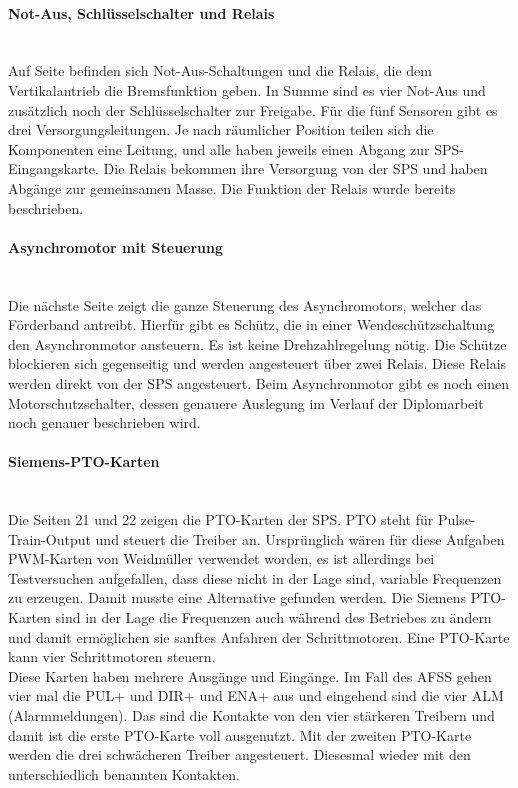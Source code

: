     \paragraph{Not-Aus, Schlüsselschalter und Relais}\mbox{}\\
    Auf Seite befinden sich Not-Aus-Schaltungen und die Relais, die dem Vertikalantrieb die Bremsfunktion geben. In Summe sind es vier Not-Aus und zusätzlich noch der Schlüsselschalter zur Freigabe. Für die fünf Sensoren gibt es drei Versorgungsleitungen. Je nach räumlicher Position teilen sich die Komponenten eine Leitung, und alle haben jeweils einen Abgang zur SPS-Eingangskarte. Die Relais bekommen ihre Versorgung von der SPS und haben Abgänge zur gemeinsamen Masse. Die Funktion der Relais wurde bereits beschrieben.
    \paragraph{Asynchromotor mit Steuerung}\mbox{}\\
    Die nächste Seite zeigt die ganze Steuerung des Asynchromotors, welcher das Förderband antreibt. Hierfür gibt es Schütz, die in einer Wendeschützschaltung den Asynchronmotor ansteuern. Es ist keine Drehzahlregelung nötig. Die Schütze blockieren sich gegenseitig und werden angesteuert über zwei Relais. Diese Relais werden direkt von der SPS angesteuert. Beim Asynchronmotor gibt es noch einen Motorschutzschalter, dessen genauere Auslegung im Verlauf der Diplomarbeit noch genauer beschrieben wird.
    \paragraph{Siemens-PTO-Karten}\mbox{}\\
    Die Seiten 21 und 22 zeigen die PTO-Karten der SPS. PTO steht für Pulse-Train-Output und steuert die Treiber an. Ursprünglich wären für diese Aufgaben PWM-Karten von Weidmüller verwendet worden, es ist allerdings bei Testversuchen aufgefallen, dass diese nicht in der Lage sind, variable Frequenzen zu erzeugen. Damit musste eine Alternative gefunden werden. Die Siemens PTO-Karten sind in der Lage die Frequenzen auch während des Betriebes zu ändern und damit ermöglichen sie sanftes Anfahren der Schrittmotoren. Eine PTO-Karte kann vier Schrittmotoren steuern.\\
    Diese Karten haben mehrere Ausgänge und Eingänge. Im Fall des AFSS gehen vier mal die PUL+ und DIR+ und ENA+ aus und eingehend sind die vier ALM (Alarmmeldungen). Das sind die Kontakte von den vier stärkeren Treibern und damit ist die erste PTO-Karte voll ausgenutzt. Mit der zweiten PTO-Karte werden die drei schwächeren Treiber angesteuert. Diesesmal wieder mit den unterschiedlich benannten Kontakten.
